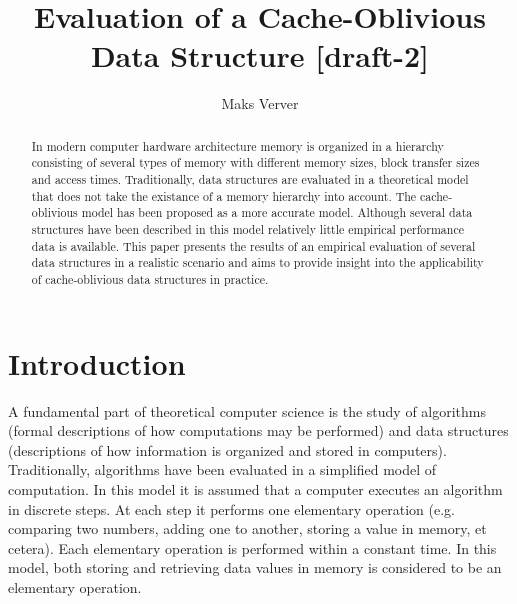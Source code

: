 \documentclass{acm_proc_article-sp}
\begin{document}
\title{Evaluation of a Cache-Oblivious Data Structure [draft-2]}

\author{Maks Verver\\ }


\maketitle

\begin{abstract}
In modern computer hardware architecture memory is organized in a hierarchy
consisting of several types of memory with different memory sizes, block
transfer sizes and access times.
Traditionally, data structures are evaluated in a theoretical model that
does not take the existance of a memory hierarchy into account. The
cache-oblivious model has been proposed as a more accurate model.
Although several data structures have been described in this model
relatively little empirical performance data is available.
This paper presents the results of an empirical evaluation of several data
structures in a realistic scenario and aims to provide insight into
the applicability of cache-oblivious data structures in practice.
\end{abstract}


\section{Introduction}
A fundamental part of theoretical computer science is the study of algorithms (formal descriptions of how computations may be performed) and data structures (descriptions of how information is organized and stored in computers). Traditionally, algorithms have been evaluated in a simplified model of computation. In this model it is assumed that a computer executes an algorithm in discrete steps. At each step it performs one elementary operation (e.g. comparing two numbers, adding one to another, storing a value in memory, et cetera). Each elementary operation is performed within a constant time. In this model, both storing and retrieving data values in memory is considered to be an elementary operation.
\end{document}
